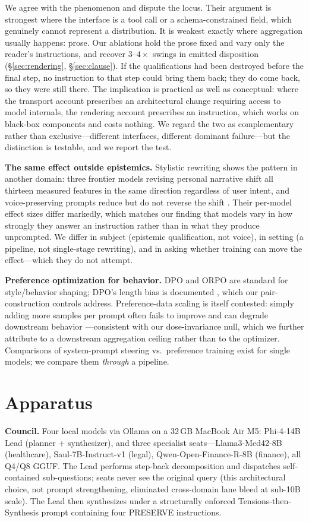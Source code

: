\documentclass[11pt]{article}
\begin{document}
We agree with the phenomenon and dispute the locus. Their argument is
strongest where the interface is a tool call or a schema-constrained field,
which genuinely cannot represent a distribution. It is weakest exactly where
aggregation usually happens: prose. Our ablations hold the prose fixed and
vary only the reader's instructions, and recover $3$--$4\times$ swings in
emitted disposition (\S\ref{sec:rendering}, \S\ref{sec:clause}). If the
qualifications had been destroyed before the final step, no instruction to
that step could bring them back; they do come back, so they were still there. The
implication is practical as well as conceptual: where the transport account
prescribes an architectural change requiring access to model internals, the
rendering account prescribes an instruction, which works on black-box
components and costs nothing. We regard the two as complementary rather than
exclusive---different interfaces, different dominant failure---but the
distinction is testable, and we report the test.

\textbf{The same effect outside epistemics.} Stylistic rewriting shows the
pattern in another domain: three frontier models revising personal narrative
shift all thirteen measured features in the same direction regardless of user
intent, and voice-preserving prompts reduce but do not reverse the shift
\cite{voicerev}. Their per-model effect sizes differ markedly, which matches
our finding that models vary in how strongly they answer an instruction rather
than in what they produce unprompted. We differ in subject (epistemic
qualification, not voice), in setting (a pipeline, not single-stage
rewriting), and in asking whether training can move the effect---which they do
not attempt.

\textbf{Preference optimization for behavior.} DPO \cite{dpo} and ORPO \cite{orpo} are standard for style/behavior shaping; DPO's length bias is documented \cite{lengthbias}, which our pair-construction controls address. Preference-data scaling is itself contested: simply adding more samples per prompt often fails to improve and can degrade downstream behavior \cite{sweetspot,air}---consistent with our dose-invariance null, which we further attribute to a downstream aggregation ceiling rather than to the optimizer. Comparisons of system-prompt steering vs.\ preference training exist for single models; we compare them \emph{through} a pipeline.

\section{Apparatus}
\textbf{Council.} Four local models via Ollama on a 32\,GB MacBook Air M5: Phi-4-14B Lead (planner + synthesizer), and three specialist seats---Llama3-Med42-8B (healthcare), Saul-7B-Instruct-v1 (legal), Qwen-Open-Finance-R-8B (finance), all Q4/Q8 GGUF. The Lead performs step-back decomposition \cite{stepback} and dispatches self-contained sub-questions; seats never see the original query (this architectural choice, not prompt strengthening, eliminated cross-domain lane bleed at sub-10B scale). The Lead then synthesizes under a structurally enforced Tensions-then-Synthesis prompt containing four PRESERVE instructions.
\end{document}
